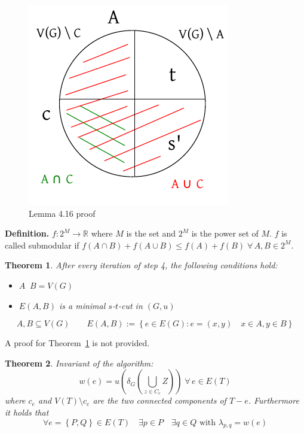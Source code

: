 \documentclass{article}
\newtheorem{theorem}{Theorem}
\newcommand{\set}[1]{\left\{#1\right\}}
\newcommand{\fall}{\;\forall\,}
\newcommand{\noproof}[1]{A proof for Theorem~\ref{#1} is not provided.}
\begin{document}
\begin{figure}[ht]
 \begin{center}
  \includegraphics{img/lemma_4_16_proof.pdf}
  \caption{Lemma 4.16 proof}
 \end{center}
\end{figure}

\textbf{Definition.}
  $f: 2^M \rightarrow \mathbb{R}$ where $M$ is the set and $2^M$ is the power set of $M$.
  $f$ is called submodular if $f(A \cap B) + f(A \cup B) \leq f(A) + f(B) \fall A, B \in 2^M$.

\begin{theorem}\label{lemma-4.17}
  After every iteration of step 4, the following conditions hold:
  \begin{itemize}
    \item $A \mathop{\dot{\cup}} B = V(G)$
    \item $E(A, B)$ is a minimal $s$-$t$-cut in $(G, u)$
  \end{itemize}
  \[
    A, B \subseteq V(G)  \qquad  E(A, B) := \set{e \in E(G): e = (x, y) \quad x \in A, y \in B}
  \]
\end{theorem}

\noproof{lemma-4.17}

\begin{theorem}\label{lemma-4.18}
  Invariant of the algorithm:
  \[
    w(e) = u(\delta_G(\bigcup_{z \in C_e} Z)) \fall e \in E(T)
  \]
  where $c_e$ and $V(T) \setminus c_e$ are the two connected components of $T - e$.
  Furthermore it holds that
  \[
    \forall e = \set{P, Q} \in E(T)
      \quad \exists p \in P
      \quad \exists q \in Q \text{ with } \lambda_{p,q} = w(e)
  \]
\end{theorem}
\end{document}
